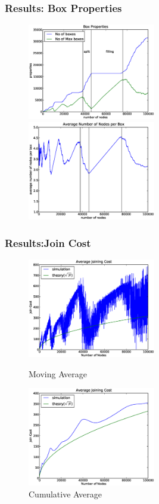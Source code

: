 \documentclass[red]{beamer}
\begin{document}
\begin{frame}
\frametitle{Results: Box Properties}
\begin{figure}
\begin{minipage}{5cm}
\centering
\includegraphics[width=2.2in]{figs/box_property.eps}
\end{minipage}
\begin{minipage}{5cm}
\centering
\includegraphics[width=2.2in]{figs/ave_no_node_box.eps}
\end{minipage}
\end{figure}
\end{frame}

\begin{frame}
\frametitle{Results:Join Cost}
\begin{figure}
\begin{minipage}{5cm}
\centering
\includegraphics[width=2.2in]{figs/join_cost_100k_10step.eps}
\caption{Moving Average} 
\end{minipage}
\begin{minipage}{5cm}
\centering
\includegraphics[width=2.2in]{figs/join_cost_100k.eps}
\caption{Cumulative Average}
\end{minipage}
\end{figure}
\end{frame}
\end{document}
